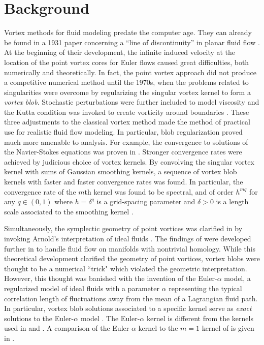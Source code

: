 \documentclass[12pt]{amsart}
\theoremstyle{remark}
\begin{document}
\section{Background}
\label{sec:background}
Vortex methods for fluid modeling predate the computer age. They can already be found in a 1931 paper concerning a ``line of discontinuity'' in planar fluid flow \cite{Rosenhead1931}.
At the beginning of their development, the infinite induced velocity at the location of the point vortex cores for Euler flows caused great difficulties, both numerically and theoretically. In fact, the point vortex approach did not produce a competitive numerical method until the 1970s, when the problems related to singularities were overcome by regularizing the singular vortex kernel to form a \emph{vortex blob}.
Stochastic perturbations were further included to model viscosity and the Kutta condition was invoked to create vorticity around boundaries \cite{Chorin1973}.
These three adjustments to the classical vortex method made the method of practical use for realistic fluid flow modeling.
In particular, blob regularization proved much more amenable to analysis. For example, the convergence to solutions of the Navier-Stokes equations was proven in \cite{Hald1979}.
Stronger convergence rates were achieved by judicious choice of vortex kernels.
By convolving the singular vortex kernel with sums of Gaussian smoothing kernels, a sequence of vortex blob kernels with faster and faster convergence rates was found.
In particular, the convergence rate of the $m$th kernel was found to be spectral, and of order $h^{mq}$ for any $q \in (0,1)$ where $h = \delta^q$
is a grid-spacing parameter and $\delta > 0$ is a length scale associated to the smoothing kernel \cite{BealeMajda1982,BealeMajda1985}.

Simultaneously, the symplectic geometry of point vortices was clarified in \cite{MarsdenWeinstein1983}
by invoking Arnold's interpretation of ideal fluids \cite{Arnold1966}.
The findings of \cite{MarsdenWeinstein1983} were developed further in \cite{GayBalmazVizman2012} to handle fluid flow on manifolds with nontrivial homology.
While this theoretical development clarified the geometry of point vortices, vortex blobs were thought to be a numerical ``trick" which violated the geometric interpretation.
However, this thought was banished with the invention of the Euler-$\alpha$ model, a regularized model of ideal fluids with a parameter $\alpha$ representing the typical correlation length of fluctuations away from the mean of a Lagrangian fluid path. In particular, vortex blob solutions associated to a specific kernel serve as \emph{exact} solutions to the Euler-$\alpha$ model \cite{OliverShkoller2001}.
The Euler-$\alpha$ kernel is different from the kernels used in \cite{Chorin1973} and \cite{BealeMajda1985}.
A comparison of the Euler-$\alpha$ kernel to the $m=1$ kernel of \cite{BealeMajda1985} is given in \cite{HolmNitschePutkaradze2006}.
\end{document}

